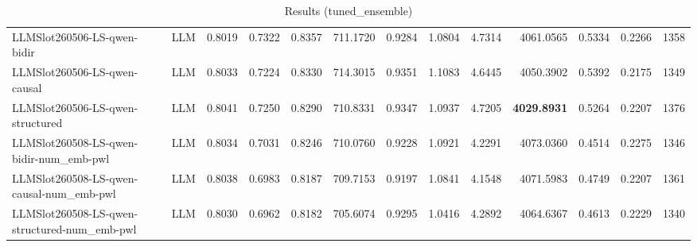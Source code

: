 \begin{table}[htbp]
{\begin{tabular}{ll|rrrrrrrrrr|r}
LLMSlot260506-LS-qwen-bidir & LLM & 0.8019 & 0.7322 & 0.8357 & 711.1720 & 0.9284 & 1.0804 & 4.7314 & 4061.0565 & 0.5334 & 0.2266 & 1358 \\
LLMSlot260506-LS-qwen-causal & LLM & 0.8033 & 0.7224 & 0.8330 & 714.3015 & 0.9351 & 1.1083 & 4.6445 & 4050.3902 & 0.5392 & 0.2175 & 1349 \\
LLMSlot260506-LS-qwen-structured & LLM & 0.8041 & 0.7250 & 0.8290 & 710.8331 & 0.9347 & 1.0937 & 4.7205 & \textbf{4029.8931} & 0.5264 & 0.2207 & 1376 \\
LLMSlot260508-LS-qwen-bidir-num\_emb-pwl & LLM & 0.8034 & 0.7031 & 0.8246 & 710.0760 & 0.9228 & 1.0921 & 4.2291 & 4073.0360 & 0.4514 & 0.2275 & 1346 \\
LLMSlot260508-LS-qwen-causal-num\_emb-pwl & LLM & 0.8038 & 0.6983 & 0.8187 & 709.7153 & 0.9197 & 1.0841 & 4.1548 & 4071.5983 & 0.4749 & 0.2207 & 1361 \\
LLMSlot260508-LS-qwen-structured-num\_emb-pwl & LLM & 0.8030 & 0.6962 & 0.8182 & 705.6074 & 0.9295 & 1.0416 & 4.2892 & 4064.6367 & 0.4613 & 0.2229 & 1340 \\
\bottomrule
\end{tabular}
}
\caption{Results (tuned_ensemble)}
\label{tab:results_tuned_ensemble}
\end{table}